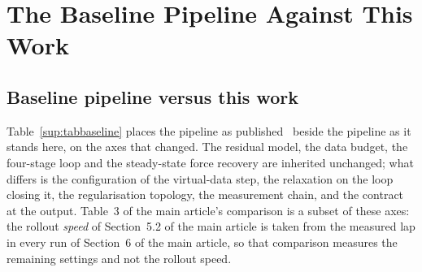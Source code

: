 \documentclass[12pt]{sn-jnl}
\begin{document}
\section{The Baseline Pipeline Against This Work}
\label{sup:baseline}

\subsection{Baseline pipeline versus this work}
\label{sup:baselinecmp}

Table~\ref{sup:tabbaseline} places the pipeline as published~\cite{ontrack2025}
beside the pipeline as it stands here, on the axes that changed. The residual
model, the data budget, the four-stage loop and the steady-state force recovery
are inherited unchanged; what differs is the configuration of the virtual-data
step, the relaxation on the loop closing it, the regularisation topology, the
measurement chain, and the contract at
the output. Table~3 of the main article's comparison is a subset of these axes:
the rollout \emph{speed} of Section~5.2 of the main article is taken from the
measured lap in every run of Section~6 of the main article, so that comparison
measures the remaining settings and not the rollout speed.
\end{document}
